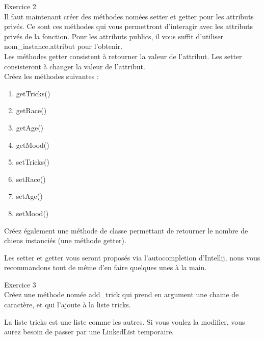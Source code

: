 \begin{Exercice} Exercice 2\\
    Il faut maintenant créer des méthodes nomées setter et getter pour les attributs privés. Ce sont ces méthodes qui vous permettront d'interagir avec les attributs privés de la fonction. Pour les attributs publics, il vous suffit d'utiliser nom\_instance.attribut pour l'obtenir. \\
    
    Les méthodes getter consistent à retourner la valeur de l'attribut. Les setter consisteront à changer la valeur de l'attribut. \\
    
    Créez les méthodes suivantes :
    \begin{enumerate}
    \item getTricks()
    \item getRace()
    \item getAge()
    \item getMood()
    \item setTricks()
    \item setRace()
    \item setAge()
    \item setMood()
    \end{enumerate}
    
    Créez également une méthode de classe permettant de retourner le nombre de chiens instanciés (une méthode getter).
   	
\begin{conseil}
   Les setter et getter vous seront proposés via l'autocompletion d'Intellij, nous vous recommandons tout de même d'en faire quelques unes à la main.
\end{conseil}
    
\begin{solution}
	
\end{solution}
\end{Exercice}

\begin{Exercice} Exercice 3\\
    Créez une méthode nomée add\_trick qui prend en argument une chaine de caractère, et qui l'ajoute à la liste tricks. \\
   	
\begin{conseil}
   La liste tricks est une liste comme les autres. Si vous voulez la modifier, vous aurez besoin de passer par une LinkedList temporaire.
\end{conseil}
    
\begin{solution}
	
\end{solution}
\end{Exercice}


